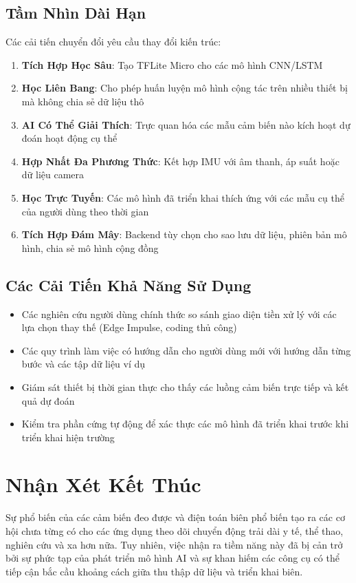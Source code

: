 \subsection{Tầm Nhìn Dài Hạn}
Các cải tiến chuyển đổi yêu cầu thay đổi kiến trúc:
\begin{enumerate}
    \item \textbf{Tích Hợp Học Sâu}: Tạo TFLite Micro cho các mô hình CNN/LSTM
    \item \textbf{Học Liên Bang}: Cho phép huấn luyện mô hình cộng tác trên nhiều thiết bị mà không chia sẻ dữ liệu thô
    \item \textbf{AI Có Thể Giải Thích}: Trực quan hóa các mẫu cảm biến nào kích hoạt dự đoán hoạt động cụ thể
    \item \textbf{Hợp Nhất Đa Phương Thức}: Kết hợp IMU với âm thanh, áp suất hoặc dữ liệu camera
    \item \textbf{Học Trực Tuyến}: Các mô hình đã triển khai thích ứng với các mẫu cụ thể của người dùng theo thời gian
    \item \textbf{Tích Hợp Đám Mây}: Backend tùy chọn cho sao lưu dữ liệu, phiên bản mô hình, chia sẻ mô hình cộng đồng
\end{enumerate}

\subsection{Các Cải Tiến Khả Năng Sử Dụng}
\begin{itemize}
    \item Các nghiên cứu người dùng chính thức so sánh giao diện tiền xử lý với các lựa chọn thay thế (Edge Impulse, coding thủ công)
    \item Các quy trình làm việc có hướng dẫn cho người dùng mới với hướng dẫn từng bước và các tập dữ liệu ví dụ
    \item Giám sát thiết bị thời gian thực cho thấy các luồng cảm biến trực tiếp và kết quả dự đoán
    \item Kiểm tra phần cứng tự động để xác thực các mô hình đã triển khai trước khi triển khai hiện trường
\end{itemize}

\section{Nhận Xét Kết Thúc}

Sự phổ biến của các cảm biến đeo được và điện toán biên phổ biến tạo ra các cơ hội chưa từng có cho các ứng dụng theo dõi chuyển động trải dài y tế, thể thao, nghiên cứu và xa hơn nữa. Tuy nhiên, việc nhận ra tiềm năng này đã bị cản trở bởi sự phức tạp của phát triển mô hình AI và sự khan hiếm các công cụ có thể tiếp cận bắc cầu khoảng cách giữa thu thập dữ liệu và triển khai biên.

